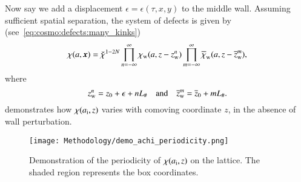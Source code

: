     Now say we add a displacement $\epsilon= \epsilon(\tau, x, y)$ to the middle wall. %
    Assuming sufficient spatial separation, the system of defects is given by (see~\cref{eq:cosmo:defects:many_kinks})
    \begin{equation}
        \chi(a,\boldsymbol{x}) = \breve{\chi}^{1-2N}\prod_{n= -\infty}^\infty \chi_\mathrm{w}(a, z- z_\mathrm{w}^{n} )\prod_{m=-\infty}^{\infty} {\overline{\chi}_\mathrm{w}(a, z-\overline{z}_\mathrm{w}^m) },
    \end{equation}
    where
    \begin{equation}\label{eq:PT:gwas:wall_antiwall_positions}
        z\ped{w}^n = z_0 + \epsilon + nL_\# %
        \quad\text{and}\quad %
        \widebar{z}\ped{w}^m = \widebar{z}_0+ mL_\#.
    \end{equation}
     demonstrates how $\chi(a_\mathrm{i}, z)$ varies with comoving coordinate $z$, in the absence of wall perturbation.
    \begin{figure}[t]
        \centering
        \texttt{[image: Methodology/demo\_achi\_periodicity.png]}
        \caption{Demonstration of the periodicity of $\chi(a_\mathrm{i},z)$ on the lattice. The shaded region represents the box coordinates.
        }%
        \label{fig:PT:gwas:demo_achi_periodicity}
    \end{figure}
    
